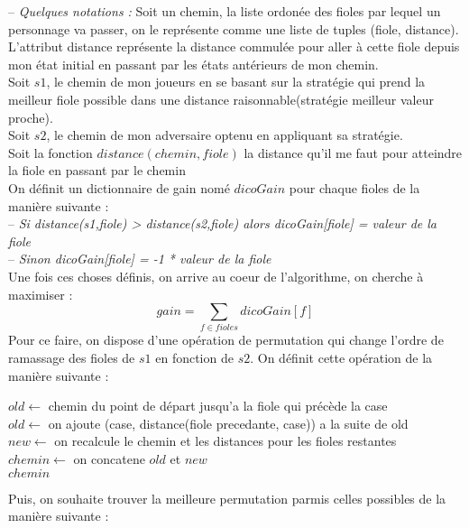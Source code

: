 \documentclass[11pt]{article}
\begin{document}
-- {\itshape Quelques notations :}
Soit un chemin, la liste ordonée des fioles par lequel un personnage va passer, on le représente comme une liste de tuples (fiole, distance). \\
L'attribut distance représente la distance commulée pour aller à cette fiole depuis mon état initial en passant par les états antérieurs de mon chemin.\\
Soit $s1$, le chemin de mon joueurs en se basant sur la stratégie qui prend la meilleur fiole possible dans une distance raisonnable(stratégie meilleur valeur proche). \\
Soit $s2$, le chemin de mon adversaire optenu en appliquant sa stratégie. \\
Soit la fonction $distance(chemin,fiole)$ la distance qu'il me faut pour atteindre la fiole en passant par le chemin \\
On définit un dictionnaire de gain nomé $dicoGain$ pour chaque fioles de la manière suivante : \\
-- {\itshape Si distance(s1,fiole) > distance(s2,fiole) alors dicoGain[fiole] = valeur de la fiole} \\
-- {\itshape Sinon dicoGain[fiole] = -1 * valeur de la fiole } \\
Une fois ces choses définis, on arrive au coeur de l'algorithme, on cherche à maximiser : \\
\[ gain = \sum_{f \in fioles} dicoGain[f] \]
Pour ce faire, on dispose d'une opération de permutation qui change l'ordre de ramassage des fioles de  $s1$ en fonction de $s2$.
On définit cette opération de la manière suivante : 

\newpage

\SetAlgoVlined
\begin{algorithm}
    $old \leftarrow $ chemin du point de départ jusqu'a la fiole qui précède la case  \\
    $old \leftarrow $ on ajoute (case, distance(fiole precedante, case)) a la suite de old\\
    $new \leftarrow $ on recalcule le chemin et les distances pour les fioles restantes \\
    $chemin \leftarrow $ on concatene $old$ et  $new$  \\
    \Retour $chemin$
\end{algorithm}

Puis, on souhaite trouver la meilleure permutation parmis celles possibles de la manière suivante :
\end{document}
